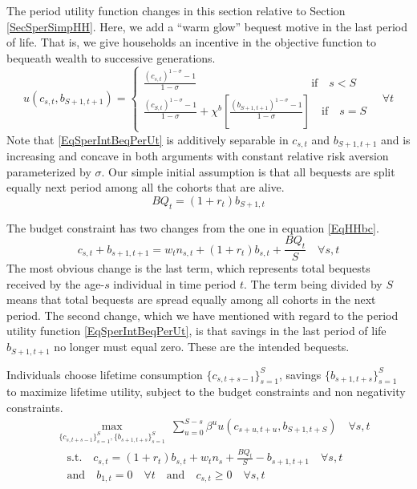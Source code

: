 \documentclass[letterpaper,12pt]{article}
\theoremstyle{definition}
\numberwithin{equation}{section}
\numberwithin{exercise}{section}
\begin{document}
\begin{spacing}{1.5}
      The period utility function changes in this section relative to Section \ref{SecSperSimpHH}. Here, we add a ``warm glow'' bequest motive in the last period of life. That is, we give households an incentive in the objective function to bequeath wealth to successive generations.
      \begin{equation}\label{EqSperIntBeqPerUt}
         u(c_{s,t},b_{S+1,t+1}) =
            \begin{cases}
               \frac{(c_{s,t})^{1-\sigma} - 1}{1-\sigma} \qquad\qquad\qquad\qquad\qquad\:\text{if}\quad s<S \\
               \frac{(c_{S,t})^{1-\sigma} - 1}{1-\sigma} + \chi^b\left[\frac{(b_{S+1,t+1})^{1-\sigma} - 1}{1-\sigma}\right]\quad\text{if}\quad s=S
            \end{cases}\quad\forall t
      \end{equation}
      Note that \eqref{EqSperIntBeqPerUt} is additively separable in $c_{s,t}$ and $b_{S+1,t+1}$ and is increasing and concave in both arguments with constant relative risk aversion parameterized by $\sigma$. Our simple initial assumption is that all bequests are split equally next period among all the cohorts that are alive.
      \begin{equation}\label{EqIntBeqTotBeq}
         BQ_t = (1 + r_t)b_{S+1,t}
      \end{equation}

      The budget constraint has two changes from the one in equation \eqref{EqHHbc}.
      \begin{equation}\label{EqIntBeqHHbc}
         c_{s,t} + b_{s+1,t+1} = w_t n_{s,t} + (1 + r_{t})b_{s,t} + \frac{BQ_t}{S} \quad\forall s,t
      \end{equation}
      The most obvious change is the last term, which represents total bequests received by the age-$s$ individual in time period $t$. The term being divided by $S$ means that total bequests are spread equally among all cohorts in the next period. The second change, which we have mentioned with regard to the period utility function \eqref{EqSperIntBeqPerUt}, is that savings in the last period of life $b_{S+1,t+1}$ no longer must equal zero. These are the intended bequests.

      Individuals choose lifetime consumption $\{c_{s,t+s-1}\}_{s=1}^S$, savings $\{b_{s+1,t+s}\}_{s=1}^{S}$ to maximize lifetime utility, subject to the budget constraints and non negativity constraints.
      \begin{equation}\label{EqSperIntBeqHHmaxprob}
         \begin{split}
            &\max_{\{c_{s,t+s-1}\}_{s=1}^S,\{b_{s+1,t+s}\}_{s=1}^{S}}\:\sum_{u=0}^{S-s}\beta^u u(c_{s+u,t+u},b_{S+1,t+S}) \quad\forall s,t \\
            &\quad\text{s.t.}\quad c_{s,t} = (1 + r_t)b_{s,t} + w_{t}n_s + \frac{BQ_t}{S} - b_{s+1,t+1} \quad\forall s,t \\
            &\quad\text{and}\quad b_{1,t}=0 \quad\forall t \quad\text{and}\quad c_{s,t}\geq 0 \quad\forall s,t
         \end{split}
      \end{equation}


\end{spacing}
\end{document}
